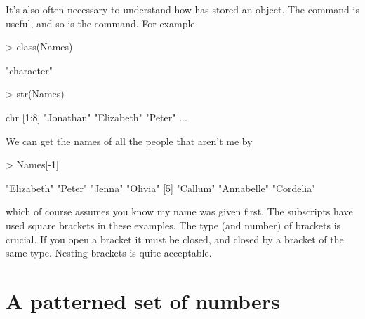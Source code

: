 It's also often necessary to understand how \R{} has stored an object. The  command is useful, and so is the  command. For example
\begin{Schunk}
\begin{Sinput}
> class(Names)
\end{Sinput}
\begin{Soutput}
[1] "character"
\end{Soutput}
\begin{Sinput}
> str(Names)
\end{Sinput}
\begin{Soutput}
 chr [1:8] "Jonathan" "Elizabeth" "Peter" ...
\end{Soutput}
\end{Schunk}
We can get the names of all the people that aren't me by
\begin{Schunk}
\begin{Sinput}
> Names[-1]
\end{Sinput}
\begin{Soutput}
[1] "Elizabeth" "Peter"     "Jenna"     "Olivia"   
[5] "Callum"    "Annabelle" "Cordelia" 
\end{Soutput}
\end{Schunk}
which of course assumes you know my name was given first. The subscripts have used square brackets in these examples. The type (and number) of brackets is crucial. If you open a bracket it must be closed, and closed by a bracket of the same type. Nesting brackets is quite acceptable.


\section{A patterned set of numbers}

